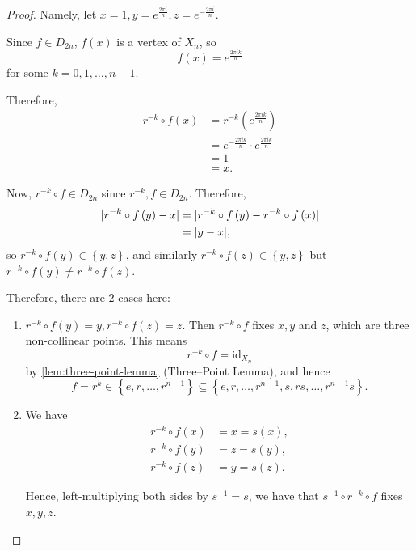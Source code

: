 \documentclass{article}
\theoremstyle{definition}
\theoremstyle{remark}
\DeclarePairedDelimiter{\abs}{\lvert}{\rvert}
\newcommand{\pqty}[1]{\left(#1\right)}
\newcommand{\Bqty}[1]{\left\{#1\right\}}
\newcommand{\inverse}{^{-1}}
\newcommand{\identity}{\mathrm{id}}
\begin{document}
\begin{proof}
    Namely, let \(x = 1, y = e^{\frac{2 \pi i}{n}}, z = e^{- \frac{2 \pi i}{n}}\).

    Since \(f \in D_{2n}\), \(f(x)\) is a vertex of \(X_n\), so
    \[
        f\pqty{x} = e^{\frac{2 \pi i k}{n}}
    \]
    for some \(k = 0, 1, \ldots, n - 1\).

    Therefore,
    \begin{align*}
        r^{-k} \circ f \pqty{x} &= r^{-k} \pqty{e^{\frac{2 \pi i k}{n}}} \\
        &= e^{- \frac{2 \pi i k}{n}} \cdot e^{\frac{2 \pi i k}{n}} \\
        &= 1 \\
        &= x.
    \end{align*}

    Now, \(r^{-k} \circ f \in D_{2n}\) since \(r^{-k}, f \in D_{2n}\). Therefore,
    \begin{align*}
        \abs{r^{-k} \circ f \pqty{y} - x} &= \abs{r^{-k} \circ f \pqty{y} - r^{-k} \circ f \pqty{x}} \\
        &= \abs{y - x},
    \end{align*}
    so \(r^{-k} \circ f \pqty{y} \in \Bqty{y, z}\), and similarly \(r^{-k} \circ f \pqty{z} \in \Bqty{y, z}\) but \(r^{-k} \circ f \pqty{y} \neq r^{-k} \circ f \pqty{z}\).

    Therefore, there are \(2\) cases here:
    \begin{enumerate}
        \item \(r^{-k} \circ f \pqty{y} = y, r^{-k} \circ f \pqty{z} = z.\) Then \(r^{-k} \circ f\) fixes \(x, y\) and \(z\), which are three non-collinear points. This means
        \[
            r^{-k} \circ f = \identity_{X_n}
        \]
        by \autoref{lem:three-point-lemma} (Three--Point Lemma), and hence
        \[
            f = r^k \in \Bqty{e, r, \ldots, r^{n - 1}} \subseteq \Bqty{e, r, \ldots, r^{n - 1}, s, rs, \ldots, r^{n - 1}s}.
        \]

        \item We have
        \begin{align*}
            r^{-k} \circ f \pqty{x} &= x = s\pqty{x}, \\
            r^{-k} \circ f \pqty{y} &= z = s\pqty{y}, \\
            r^{-k} \circ f \pqty{z} &= y = s\pqty{z}.
        \end{align*}

        Hence, left-multiplying both sides by \(s\inverse = s\), we have that \(s\inverse \circ r^{-k} \circ f\) fixes \(x, y, z\).


\end{enumerate}
\end{proof}
\end{document}
